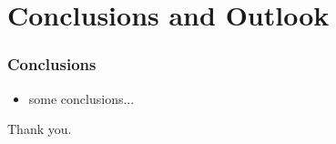 \section*{Conclusions and Outlook}

\begin{frame}
    \frametitle{Conclusions}

    \begin{itemize}
    \item some conclusions...
    \end{itemize}
\end{frame}

\begin{frame}[c]
\centering
\Large{Thank you.}
\end{frame}
